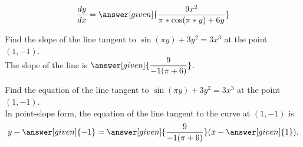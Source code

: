 \documentclass[handout]{ximera}
\begin{document}
\begin{problem}
\begin{question}
    \[
    \displaystyle \dfrac{dy}{dx} = \answer[given]{\dfrac{9x^2}{\pi *\cos(\pi*y) + 6y}}
    \]
    \end{question}
    

	\begin{question}
    Find the slope of the line tangent to $\displaystyle\sin \left(\pi y\right)+3y^2=3x^3$ at the point $(1,-1)$.\\
    
    The slope of the line is $\answer[given]{\dfrac{9}{-1(\pi +6)}}$.
    \end{question}
	
	\begin{question}
    Find the equation of the line tangent to $\displaystyle\sin \left(\pi y\right)+3y^2=3x^3$ at the point $(1,-1)$. \\
    
    In point-slope form, the equation of the line tangent to the curve at $(1,-1)$ is \\
    
    \[
    y - \answer[given]{-1} = \answer[given]{\dfrac{9}{-1(\pi +6)}} ( x - \answer[given]{1}).
    \]
    \end{question}
\end{problem}
\end{document}
